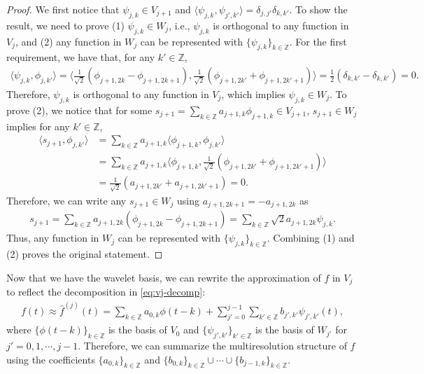 \documentclass{article}
\newcommand{\inner}[2]{\langle{#1},{#2}\rangle}
\theoremstyle{plain}
\theoremstyle{definition}
\theoremstyle{remark}
\begin{document}
\begin{proof}
    We first notice that $\psi_{j,k} \in V_{j+1}$ and $\inner{\psi_{j,k}}{\psi_{j',k'}} = \delta_{j,j'}\delta_{k,k'}$. 
    To show the result, we need to prove (1) $\psi_{j,k} \in W_j$, i.e., $\psi_{j,k}$ is orthogonal to any function in $V_j$, and (2) any function in $W_j$ can be represented with $\{\psi_{j,k}\}_{k\in \mathbb{Z}}$. 
    For the first requirement, we have that, for any $k'\in \mathbb{Z}$,
    \begin{align*}
        \inner{\psi_{j,k}}{\phi_{j, k'}} = \inner{\frac{1}{\sqrt{2}}(\phi_{j+1, 2k} - \phi_{j+1, 2k+1})}{\frac{1}{\sqrt{2}}(\phi_{j+1, 2k'} + \phi_{j+1, 2k'+1})} = \frac{1}{2}(\delta_{k,k'} - \delta_{k,k'}) = 0. 
    \end{align*}
    Therefore, $\psi_{j,k}$ is orthogonal to any function in $V_j$, which implies $\psi_{j,k} \in W_j$. 
To prove (2), we notice that for some $s_{j+1} = \sum_{k\in \mathbb{Z}} a_{j+1,k} \phi_{j+1,k} \in V_{j+1}$, $s_{j+1} \in W_j$ implies for any $k'\in \mathbb{Z}$,
\begin{align*}
    \inner{s_{j+1}}{\phi_{j,k'}} &= \sum_{k\in \mathbb{Z}} a_{j+1,k} \inner{\phi_{j+1,k}}{\phi_{j, k'}} \\
    &= \sum_{k\in \mathbb{Z}} a_{j+1,k} \inner{\phi_{j+1,k}}{\frac{1}{\sqrt{2}}(\phi_{j+1,2k'} + \phi_{j+1, 2k' + 1})} \\
    &= \frac{1}{\sqrt{2}}(a_{j + 1,2k'} + a_{j + 1,2k' + 1}) = 0.
\end{align*}
Therefore, we can write any $s_{j+1} \in W_j$ using $a_{j+1,2k+1} = -a_{j+1,2k}$ as 
\begin{align*} 
    s_{j+1} = \sum_{k\in \mathbb{Z}} a_{j+1,2k} (\phi_{j+1, 2k} - \phi_{j+1, 2k + 1}) = \sum_{k\in \mathbb{Z}} \sqrt{2} a_{j+1,2k} \psi_{j,k}. 
\end{align*}
Thus, any function in $W_j$ can be represented with $\{\psi_{j,k}\}_{k\in \mathbb{Z}}$. 
Combining (1) and (2) proves the original statement. 
\end{proof}

Now that we have the wavelet basis, we can rewrite the approximation of $f$ in $V_j$ to reflect the decomposition in \eqref{eq:vj-decomp}:
\begin{align} \label{eq:wavelet-expansion}
    f(t) \approx \hat{f}^{(j)}(t) = \sum_{k\in \mathbb{Z}} a_{0,k} \phi(t - k) + \sum_{j'=0}^{j-1} \sum_{k'\in \mathbb Z} b_{j',k'} \psi_{j',k'}(t), 
\end{align}
where $\{\phi(t - k)\}_{k\in \mathbb{Z}}$ is the basis of $V_0$ and $\{\psi_{j',k'}\}_{k'\in \mathbb{Z}}$ is the basis of $W_{j'}$ for $j' = 0, 1, \cdots, j - 1$. 
Therefore, we can summarize the multiresolution structure of $f$ using the coefficients $\{a_{0,k}\}_{k\in \mathbb{Z}}$ and $\{b_{0,k}\}_{k\in \mathbb{Z}} \cup \cdots \cup \{b_{j-1,k}\}_{k\in \mathbb{Z}}$. 
\end{document}
